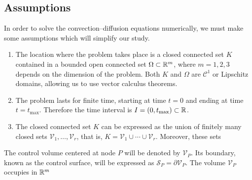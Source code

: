 
\subsection{Assumptions}

In order to solve the convection--diffusion equations numerically, we must make some assumptions which will simplify our study.
\begin{enumerate}
	\item The location where the problem takes place is a closed connected set $K$ contained in a bounded open connected set $\Omega \subset \mathbb{R}^m$, where $m = 1, 2, 3$ depends on the dimension of the problem. Both $K$ and $\Omega$ are $\mathcal{C}^1$ or Lipschitz domains, allowing us to use vector calculus theorems.
	\item The problem lasts for finite time, starting at time $t = 0$ and ending at time $t = t_\text{max}$. Therefore the time interval is $I = (0, t_\text{max}) \subset \mathbb{R}$.
	\item The closed connected set $K$ can be expressed as the union of finitely many closed sets $\mathcal{V}_1, \ldots, \mathcal{V}_r$, that is, $K = \mathcal{V}_1 \cup \cdots \cup \mathcal{V}_r$. Moreover, these sets
\end{enumerate}

The control volume centered at node $P$ will be denoted by $\mathcal{V}_P$. Its boundary, known as the control surface, will be expressed as $\mathcal{S}_P = \partial \mathcal{V}_P$. The volume $\mathcal{V}_P$ occupies in $\mathbb{R}^m$ 